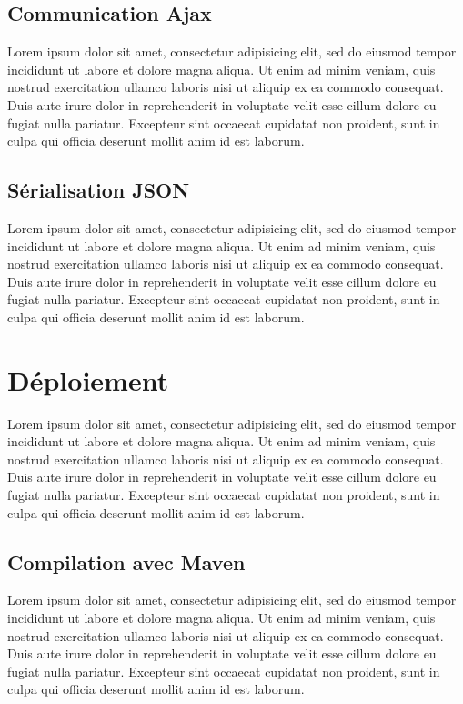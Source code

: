 \documentclass{article}
\begin{document}
\subsection{Communication Ajax} %
\label{sub:communication_ajax}
Lorem ipsum dolor sit amet, consectetur adipisicing elit, sed do eiusmod tempor incididunt ut labore et dolore magna aliqua. Ut enim ad minim veniam, quis nostrud exercitation ullamco laboris nisi ut aliquip ex ea commodo consequat. Duis aute irure dolor in reprehenderit in voluptate velit esse cillum dolore eu fugiat nulla pariatur. Excepteur sint occaecat cupidatat non proident, sunt in culpa qui officia deserunt mollit anim id est laborum.

\subsection{Sérialisation JSON} %
\label{sub:serialisation_json}
Lorem ipsum dolor sit amet, consectetur adipisicing elit, sed do eiusmod tempor incididunt ut labore et dolore magna aliqua. Ut enim ad minim veniam, quis nostrud exercitation ullamco laboris nisi ut aliquip ex ea commodo consequat. Duis aute irure dolor in reprehenderit in voluptate velit esse cillum dolore eu fugiat nulla pariatur. Excepteur sint occaecat cupidatat non proident, sunt in culpa qui officia deserunt mollit anim id est laborum.


\section{Déploiement} %
\label{sec:deploiement}
Lorem ipsum dolor sit amet, consectetur adipisicing elit, sed do eiusmod tempor incididunt ut labore et dolore magna aliqua. Ut enim ad minim veniam, quis nostrud exercitation ullamco laboris nisi ut aliquip ex ea commodo consequat. Duis aute irure dolor in reprehenderit in voluptate velit esse cillum dolore eu fugiat nulla pariatur. Excepteur sint occaecat cupidatat non proident, sunt in culpa qui officia deserunt mollit anim id est laborum.

\subsection{Compilation avec Maven} %
\label{sub:compilation_avec_maven}
Lorem ipsum dolor sit amet, consectetur adipisicing elit, sed do eiusmod tempor incididunt ut labore et dolore magna aliqua. Ut enim ad minim veniam, quis nostrud exercitation ullamco laboris nisi ut aliquip ex ea commodo consequat. Duis aute irure dolor in reprehenderit in voluptate velit esse cillum dolore eu fugiat nulla pariatur. Excepteur sint occaecat cupidatat non proident, sunt in culpa qui officia deserunt mollit anim id est laborum.
\end{document}
